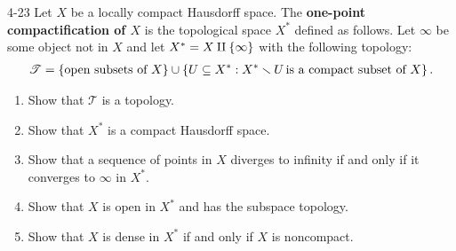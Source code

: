 \begin{problem}{4-23}\label{problem:4-23}
Let $X$ be a locally compact Hausdorff space. The \textbf{one-point compactification of $X$} is the topological space $X^{*}$ defined as follows. Let $\infty$ be some object not in $X$ and let $X^{*} = X \amalg \left\{{\infty}\right\}$ with the following topology:
\begin{align*}
	\mathscr{T} = \left\{{\text{open subsets of $X$}}\right\} \cup \left\{{U \subseteq X^{*} : X^{*} \smallsetminus U \,\text{is a compact subset of $X$}}\right\}.
\end{align*}
\begin{enumerate}[label={(\alph*)}]
	\item Show that $\mathscr{T}$ is a topology.
	\item Show that $X^{*}$ is a compact Hausdorff space.
	\item Show that a sequence of points in $X$ diverges to infinity if and only if it converges to $\infty$ in $X^{*}$.
	\item Show that $X$ is open in $X^{*}$ and has the subspace topology.
	\item Show that $X$ is dense in $X^{*}$ if and only if $X$ is noncompact.
\end{enumerate}
\end{problem}

